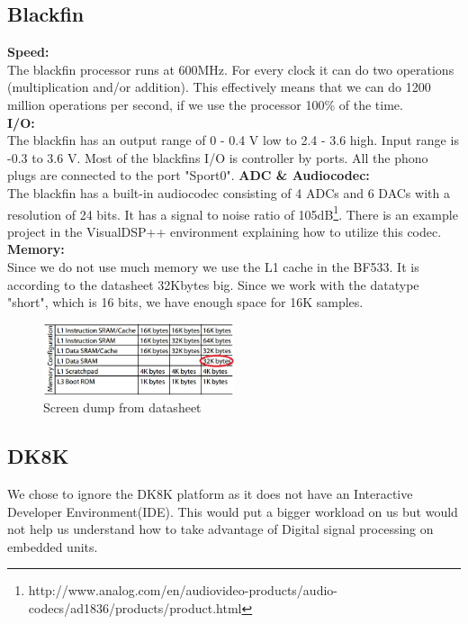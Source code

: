 \subsection{Blackfin}
\textbf{Speed:}\\
The blackfin processor runs at 600MHz. For every clock it can do two operations (multiplication and/or addition). This effectively means that we can do 1200 million operations per second, if we use the processor 100\% of the time.\\
\textbf{I/O:}\\
The blackfin has an output range of 0 - 0.4 V low to 2.4 - 3.6 high. Input range is -0.3 to 3.6 V. Most of the blackfins I/O is controller by ports. All the phono plugs are connected to the port "Sport0". 
\textbf{ADC \& Audiocodec:}\\
The blackfin has a built-in audiocodec consisting of 4 ADCs and 6 DACs with a resolution of 24 bits. It has a signal to noise ratio of 105dB\footnote{http://www.analog.com/en/audiovideo-products/audio-codecs/ad1836/products/product.html}. There is an example project in the VisualDSP++ environment explaining how to utilize this codec.\\
\textbf{Memory:}\\
Since we do not use much memory we use the L1 cache in the BF533. It is according to the datasheet 32Kbytes big. Since we work with the datatype "short", which is 16 bits, we have enough space for 16K samples.\\
\begin{figure}[hbpt]
\centering
\includegraphics[width=0.5\textwidth]{billeder/memorytable}
\caption[Screen dump from datasheet]{Screen dump from datasheet\footnotemark}
\label{img:mem_table}
\end{figure}
\subsection{DK8K}
We chose to ignore the DK8K platform as it does not have an Interactive Developer Environment(IDE). This would put a bigger workload on us but would not help us understand how to take advantage of Digital signal processing on embedded units.
